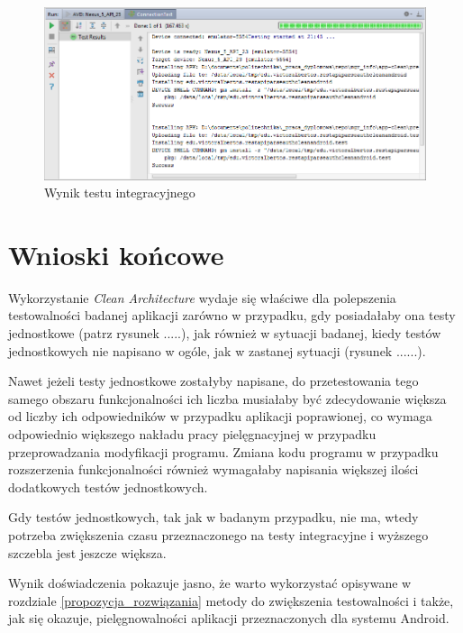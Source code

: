 \begin{figure}[!htb]
    \centering
    \includegraphics[width=15cm]{imgs/ch6_app_cl_test6.png}
    \caption
{Wynik testu integracyjnego}
    \label{fig:app_cl_test6}
\end{figure} 

\section{Wnioski końcowe}
Wykorzystanie \textit{Clean Architecture} wydaje się właściwe dla polepszenia testowalności badanej aplikacji zarówno w przypadku, gdy posiadałaby ona testy jednostkowe (patrz rysunek .....), jak również w sytuacji badanej, kiedy testów jednostkowych nie napisano w ogóle, jak w zastanej sytuacji (rysunek ......).

Nawet jeżeli testy jednostkowe zostałyby napisane, do przetestowania tego samego obszaru funkcjonalności ich liczba musiałaby być zdecydowanie większa od liczby ich odpowiedników w przypadku aplikacji poprawionej, co wymaga odpowiednio większego nakładu pracy pielęgnacyjnej w przypadku przeprowadzania modyfikacji programu. Zmiana kodu programu w przypadku rozszerzenia funkcjonalności również wymagałaby napisania większej ilości dodatkowych testów jednostkowych.

Gdy testów jednostkowych, tak jak w badanym przypadku, nie ma, wtedy potrzeba zwiększenia czasu przeznaczonego na testy integracyjne i wyższego szczebla jest jeszcze większa. 

Wynik doświadczenia pokazuje jasno, że warto wykorzystać opisywane w rozdziale \ref{propozycja_rozwiązania} metody do zwiększenia testowalności i także, jak się okazuje, pielęgnowalności aplikacji przeznaczonych dla systemu Android. 
